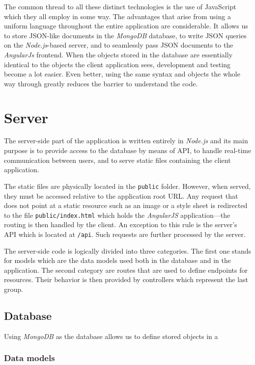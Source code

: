 \documentclass[thesis=M,english,hidelinks]{FITthesis}[2012/10/20]
\newcommand{\code}{\texttt}
\begin{document}
The common thread to all these distinct technologies is the use of JavaScript which they all employ in some way. The advantages that arise from using a uniform language throughout the entire application are considerable. It allows us to store JSON-like documents in the \textit{MongoDB} database, to write JSON queries on the \textit{Node.js}-based server, and to seamlessly pass JSON documents to the \textit{AngularJs} frontend. When the objects stored in the database are essentially identical to the objects the client application sees, development and testing become a lot easier. Even better, using the same syntax and objects the whole way through greatly reduces the barrier to understand the code.

  \section{Server}

The server-side part of the application is written entirely in \textit{Node.js} and its main purpose is to provide access to the database by means of API, to handle real-time communication between users, and to serve static files containing the client application.

The static files are physically located in the \code{public} folder. However, when served, they must be accessed relative to the application root URL. Any request that does not point at a static resource such as an image or a style sheet is redirected to the file \code{public/index.html} which holds the \textit{AngularJS} application---the routing is then handled by the client. An exception to this rule is the server's API which is located at \code{/api}. Such requests are further processed by the server.

The server-side code is logically divided into three categories. The first one stands for models which are the data models used both in the database and in the application. The second category are routes that are used to define endpoints for resources. Their behavior is then provided by controllers which represent the last group.

    \subsection{Database}

Using \textit{MongoDB} as the database allows us to define stored objects in a \cite{mongoose}

      \subsubsection{Data models}
\end{document}
